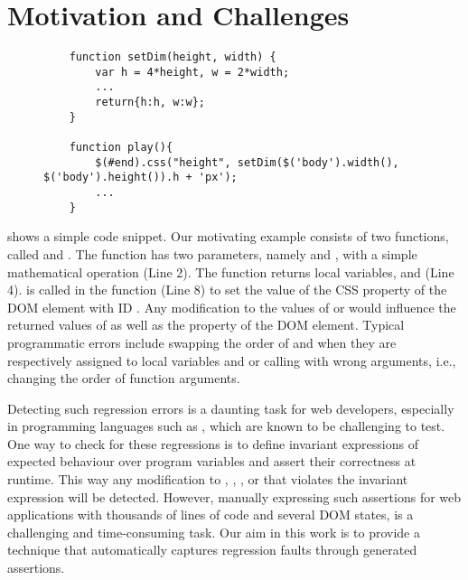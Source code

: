 \section{Motivation and Challenges}
\label{Sec:motivation}

\begin{figure}[t]
\medskip
\begin{lstlisting}
	function setDim(height, width) {		
		var h = 4*height, w = 2*width;		
		...
		return{h:h, w:w};
	}
	
	function play(){
		$(#end).css("height", setDim($('body').width(), $('body').height()).h + 'px');		
		...
	}	
\end{lstlisting}
\vspace{0.1in} 
\label{Fig:motivating_example}
\end{figure}

 shows a simple \javascript code snippet. %
Our motivating example consists of two functions, called  and . The  function has two parameters, namely  and , with a 
simple mathematical operation (Line 2). The function returns local variables,  and  (Line 4).  is called in the  function (Line 8) to set the  value of the CSS property of the DOM element with ID .
Any modification to the values of  or  would influence the returned values of  as well as the property of the DOM element.
Typical programmatic errors include swapping the order of  and  when they are respectively assigned to local variables  and  or calling  with wrong arguments, i.e., changing the order of function arguments. 

Detecting such regression errors is a daunting task for web developers, especially in programming languages such as \javascript, which are known to be challenging to test.
One way to check for these regressions is to define invariant expressions of expected behaviour \cite{Meyer:1992} over program variables and assert their correctness at runtime. 
This way any modification to , , , or  that violates the invariant expression will be detected. However, manually expressing such assertions for web applications with thousands of lines of \javascript code and several DOM states, is a challenging and time-consuming task. Our aim in this work is to provide a technique that automatically captures regression faults through generated \javascript  assertions.

